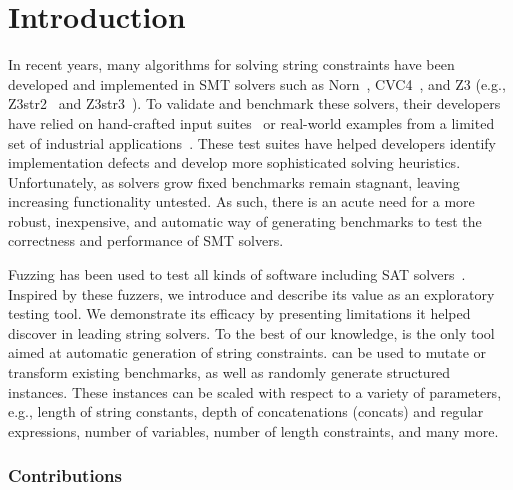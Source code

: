 \section{Introduction}

In recent years, many algorithms for solving string constraints have
been developed and implemented in SMT solvers such as Norn~\cite{norn},
CVC4~\cite{cvc4}, and Z3 (e.g., Z3str2~\cite{z3str2} and Z3str3~\cite{z3str3}).
To validate and benchmark these solvers, their developers have relied on
hand-crafted input suites~\cite{cvc4-tests,z3str3-tests,z3str2-tests} or
real-world examples from a limited set of industrial
applications~\cite{kaluza,kausler}. These test suites have helped
developers identify implementation defects and develop more
sophisticated solving heuristics. Unfortunately, as solvers grow
fixed benchmarks remain stagnant, leaving increasing functionality untested.
As such, there is an acute need for a more robust, inexpensive, and automatic way
of generating benchmarks to test
the correctness and performance of SMT solvers.

Fuzzing has been used to test all kinds of software
including SAT solvers~\cite{fuzzsat}. Inspired by these fuzzers,
we introduce \fuzzer{} and describe its value
as an exploratory testing tool. We demonstrate its efficacy
by presenting limitations it helped discover in
leading string solvers. To the best of our knowledge, \fuzzer{} is the
only tool aimed at automatic generation of string constraints. \fuzzer{} can
be used to mutate or transform existing benchmarks, as well as
randomly generate structured instances. These instances can be scaled with
respect to a variety of parameters, e.g., length of string constants,
depth of concatenations (concats) and regular expressions, number of variables,
number of length constraints, and many more.

\subsubsection{Contributions}


